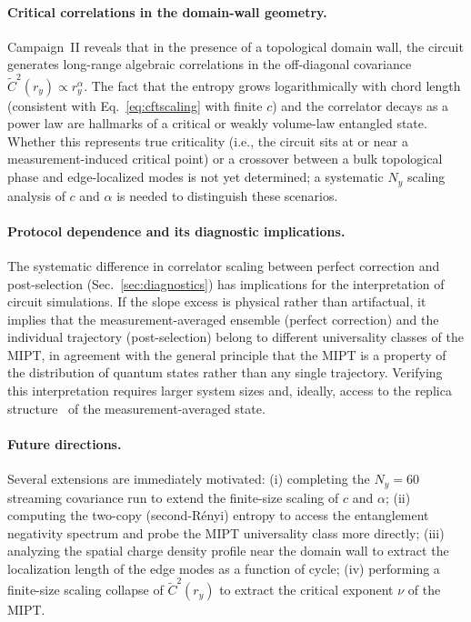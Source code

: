 \documentclass[twocolumn,aps,prx,10pt,floatfix]{revtex4-2}
\begin{document}
\paragraph{Critical correlations in the domain-wall geometry.}
Campaign~II reveals that in the presence of a topological domain wall,
the circuit generates long-range algebraic correlations in the off-diagonal
covariance $\widetilde{C}^2(r_y) \propto r_y^\alpha$.  The fact that the
entropy grows logarithmically with chord length (consistent with
Eq.~\eqref{eq:cftscaling} with finite $c$) and the correlator decays
as a power law are hallmarks of a critical or weakly volume-law entangled
state.  Whether this represents true criticality (i.e., the circuit sits
at or near a measurement-induced critical point) or a crossover between
a bulk topological phase and edge-localized modes is not yet determined;
a systematic $N_y$ scaling analysis of $c$ and $\alpha$ is needed to
distinguish these scenarios.

\paragraph{Protocol dependence and its diagnostic implications.}
The systematic difference in correlator scaling between perfect correction
and post-selection (Sec.~\ref{sec:diagnostics}) has implications for the
interpretation of circuit simulations.  If the slope excess is physical
rather than artifactual, it implies that the measurement-averaged ensemble
(perfect correction) and the individual trajectory (post-selection) belong
to different universality classes of the MIPT, in agreement with the
general principle that the MIPT is a property of the distribution
of quantum states rather than any single trajectory.  Verifying this
interpretation requires larger system sizes and, ideally, access to the
replica structure~\cite{Bao2020,Jian2020} of the measurement-averaged state.

\paragraph{Future directions.}
Several extensions are immediately motivated:
(i) completing the $N_y = 60$ streaming covariance run to extend the
finite-size scaling of $c$ and $\alpha$;
(ii) computing the two-copy (second-R\'enyi) entropy to access the
entanglement negativity spectrum and probe the MIPT universality class more
directly;
(iii) analyzing the spatial charge density profile near the domain wall to
extract the localization length of the edge modes as a function of cycle;
(iv) performing a finite-size scaling collapse of $\widetilde{C}^2(r_y)$
to extract the critical exponent $\nu$ of the MIPT.
\end{document}
